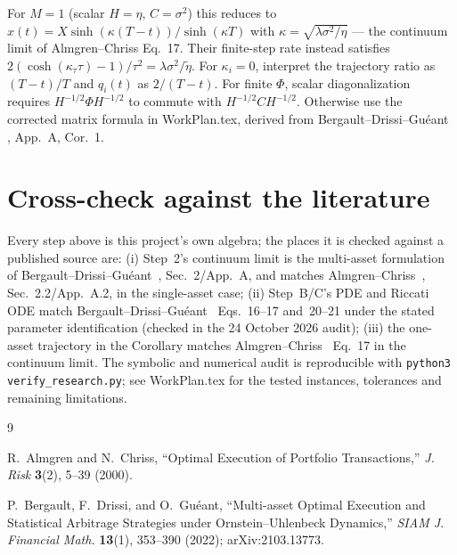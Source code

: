 \documentclass[11pt,a4paper]{article}
\begin{document}
For $M=1$ (scalar $H=\eta$, $C=\sigma^2$) this reduces to
$x(t)=X\sinh(\kappa(T-t))/\sinh(\kappa T)$ with
$\kappa=\sqrt{\lambda\sigma^2/\eta}$ --- the continuum limit of Almgren--Chriss
\cite{almgrenchriss2000} Eq.~17. Their finite-step rate instead satisfies
$2(\cosh(\kappa_\tau\tau)-1)/\tau^2=\lambda\sigma^2/\tilde\eta$.
For $\kappa_i=0$, interpret the trajectory ratio as $(T-t)/T$ and
$q_i(t)$ as $2/(T-t)$. For finite $\Phi$, scalar diagonalization requires
$H^{-1/2}\Phi H^{-1/2}$ to commute with $H^{-1/2}CH^{-1/2}$.
Otherwise use the corrected matrix formula in WorkPlan.tex, derived from
Bergault--Drissi--Gu\'eant \cite{bergault2022}, App.~A, Cor.~1.

\section*{Cross-check against the literature}

Every step above is this project's own algebra; the places it is checked
against a published source are: (i) Step~2's continuum limit is the
multi-asset formulation of Bergault--Drissi--Gu\'eant~\cite{bergault2022},
Sec.~2/App.~A, and matches Almgren--Chriss~\cite{almgrenchriss2000},
Sec.~2.2/App.~A.2, in the single-asset case; (ii) Step~B/C's PDE and Riccati
ODE match Bergault--Drissi--Gu\'eant~\cite{bergault2022} Eqs.~16--17
and~20--21 under the stated parameter identification (checked
in the 24 October 2026 audit); (iii) the one-asset trajectory in the
Corollary matches Almgren--Chriss~\cite{almgrenchriss2000} Eq.~17 in the continuum limit.
The symbolic and numerical audit is reproducible with
\texttt{python3 verify\_research.py}; see WorkPlan.tex for the tested
instances, tolerances and remaining limitations.

\begin{thebibliography}{9}

 R.~Almgren and N.~Chriss, ``Optimal Execution of
Portfolio Transactions,'' \emph{J. Risk} \textbf{3}(2), 5--39 (2000).

 P.~Bergault, F.~Drissi, and O.~Gu\'eant, ``Multi-asset
Optimal Execution and Statistical Arbitrage Strategies under
Ornstein--Uhlenbeck Dynamics,'' \emph{SIAM J. Financial Math.} \textbf{13}(1),
353--390 (2022); arXiv:2103.13773.

\end{thebibliography}
\end{document}
